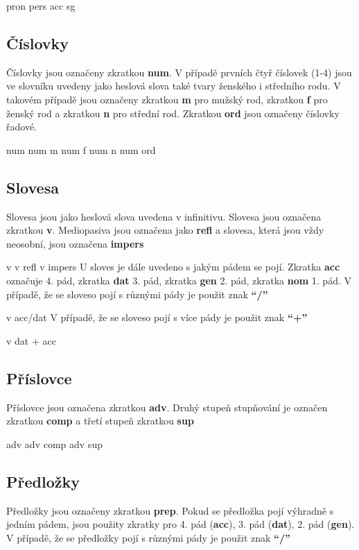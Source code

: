  {\small{ pron pers acc sg}}

\subsection{Číslovky}
Číslovky jsou označeny zkratkou \textbf{num}. V případě prvních čtyř číslovek (1-4) jsou ve slovníku uvedeny jako heslová slova také tvary ženského i středního rodu. V takovém případě jsou označeny zkratkou \textbf{m} pro mužský rod, zkratkou \textbf{f} pro ženský rod a zkratkou \textbf{n} pro střední rod. Zkratkou \textbf{ord} jsou označeny číslovky řadové.


 {\small{ num}}
 {\small{ num m}}
 {\small{ num f}}
 {\small{ num n}}
 {\small{ num ord}}

\subsection{Slovesa}
Slovesa jsou jako heslová slova uvedena v infinitivu. Slovesa jsou označena zkratkou \textbf{v}. Mediopasiva jsou označena jako \textbf{refl} a slovesa, která jsou vždy neosobní, jsou označena \textbf{impers}


 {\small{ v}}
 {\small{ v refl}}
 {\small{ v impers}}
U sloves je dále uvedeno s jakým pádem se pojí. Zkratka \textbf{acc} označuje 4. pád, zkratka \textbf{dat} 3. pád, zkratka \textbf{gen} 2. pád, zkratka \textbf{nom} 1. pád. V případě, že se sloveso pojí s různými pády je použit znak \textbf{“/”}


 {\small{ v acc/dat}}
V případě, že se sloveso pojí s více pády je použit znak \textbf{“+”}

	
 {\small{ v dat + acc}}
 
\subsection{Příslovce}
Příslovce jsou označena zkratkou \textbf{adv}. Druhý stupeň stupňování je označen zkratkou \textbf{comp} a třetí stupeň zkratkou \textbf{sup}


 {\small{ adv}}
 {\small{ adv comp }}
 {\small{ adv sup}}

\subsection{Předložky}
Předložky jsou označeny zkratkou \textbf{prep}. Pokud se předložka pojí výhradně s jedním pádem, jsou použity zkratky pro 4. pád (\textbf{acc}), 3. pád (\textbf{dat}), 2. pád (\textbf{gen}). V případě, že se předložky pojí s různými pády je použit znak \textbf{“/”}


